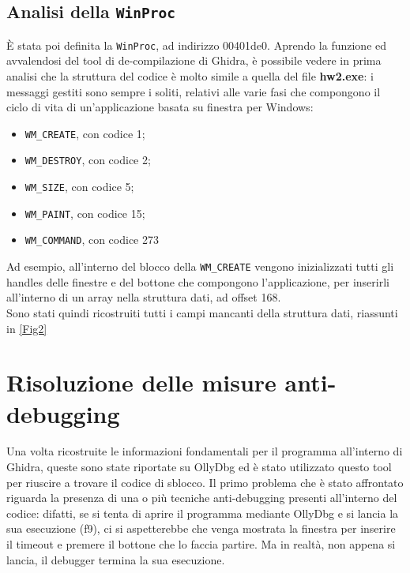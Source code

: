 \documentclass{article}
\begin{document}
\subsection{Analisi della \texttt{WinProc}}
È stata poi definita la \texttt{WinProc}, ad indirizzo 00401de0. Aprendo la funzione ed avvalendosi del tool di de-compilazione di Ghidra, è possibile vedere in prima analisi che la struttura del codice è molto simile a quella del file \textbf{hw2.exe}: i messaggi gestiti sono sempre i soliti, relativi alle varie fasi che compongono il ciclo di vita di un'applicazione basata su finestra per Windows:
\begin{itemize}
\item \texttt{WM\_CREATE}, con codice 1;
\item \texttt{WM\_DESTROY}, con codice 2;
\item \texttt{WM\_SIZE}, con codice 5;
\item \texttt{WM\_PAINT}, con codice 15;
\item \texttt{WM\_COMMAND}, con codice 273
\end{itemize}
Ad esempio, all'interno del blocco della \texttt{WM\_CREATE} vengono inizializzati tutti gli handles delle finestre e del bottone che compongono l'applicazione, per inserirli all'interno di un array nella struttura dati, ad offset 168.\\Sono stati quindi ricostruiti tutti i campi mancanti della struttura dati, riassunti in \ref{Fig2}
\section{Risoluzione delle misure anti-debugging}
Una volta ricostruite le informazioni fondamentali per il programma all'interno di Ghidra, queste sono state riportate su OllyDbg ed è stato utilizzato questo tool per riuscire a trovare il codice di sblocco. Il primo problema che è stato affrontato riguarda la presenza di una o più tecniche anti-debugging presenti all'interno del codice: difatti, se si tenta di aprire il programma mediante OllyDbg e si lancia la sua esecuzione (f9), ci si aspetterebbe che venga mostrata la finestra per inserire il timeout e premere il bottone che lo faccia partire. Ma in realtà, non appena si lancia, il debugger termina la sua esecuzione.
\end{document}
